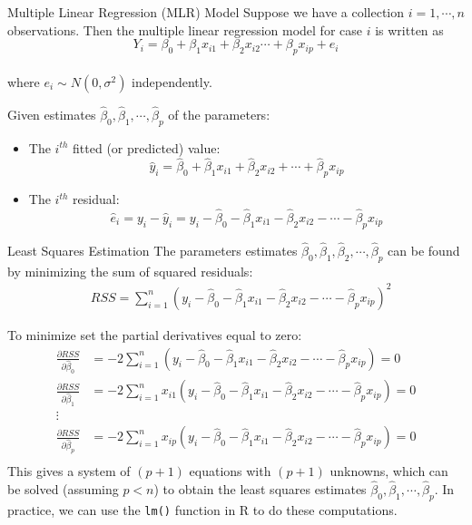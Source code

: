\documentclass[10pt]{beamer}
\begin{document}
\begin{frame}{Multiple Linear Regression (MLR) Model}
Suppose we have a collection $i=1,\cdots,n$ observations.  Then the multiple linear regression model for case $i$ is written as
$$Y_i = \beta_0 + \beta_1 x_{i1} + \beta_2 x_{i2} \cdots + \beta_p x_{ip} + e_i$$\\
where $e_i \sim N(0, \sigma^2)$ independently.
\vspace{15pt}

Given estimates $\hat{\beta}_0, \hat{\beta}_1, \cdots, \hat{\beta}_p$ of the parameters:
\begin{itemize}
\item The $i^{th}$ fitted (or predicted) value:
$$\hat{y}_i = \hat{\beta}_0 + \hat{\beta}_1 x_{i1} + \hat{\beta}_2 x_{i2} + \cdots + \hat{\beta}_p x_{ip}$$
\item The $i^{th}$ residual:
$$\hat{e}_i = y_i-\hat{y}_i = y_i - \hat{\beta}_0 - \hat{\beta}_1 x_{i1} - \hat{\beta}_2 x_{i2} - \cdots - \hat{\beta}_p x_{ip}$$
\end{itemize}
\end{frame}

\begin{frame}{Least Squares Estimation}
The parameters estimates $\hat{\beta}_0, \hat{\beta}_1, \hat{\beta}_2, \cdots, \hat{\beta}_p$ can be found by minimizing the sum of squared residuals:
\begin{align*}
&RSS = \sum_{i=1}^n (y_i - \hat{\beta}_0 - \hat{\beta}_1 x_{i1} - \hat{\beta}_2 x_{i2} - \cdots - \hat{\beta}_p x_{ip})^2
\end{align*}
\end{frame}

\begin{frame}
To minimize set the partial derivatives equal to zero:
\begin{align*}
\frac{\partial RSS}{\partial \hat{\beta}_0} &= -2 \sum_{i=1}^n (y_i - \hat{\beta}_0 - \hat{\beta}_1 x_{i1} - \hat{\beta}_2 x_{i2} - \cdots - \hat{\beta}_p x_{ip}) = 0\\
\frac{\partial RSS}{\partial \hat{\beta}_1} &= -2 \sum_{i=1}^n x_{i1} (y_i - \hat{\beta}_0 - \hat{\beta}_1 x_{i1} - \hat{\beta}_2 x_{i2} - \cdots - \hat{\beta}_p x_{ip}) = 0\\
\vdots\\
\frac{\partial RSS}{\partial \hat{\beta}_p} &= -2 \sum_{i=1}^n x_{ip} (y_i - \hat{\beta}_0 - \hat{\beta}_1 x_{i1} - \hat{\beta}_2 x_{i2} - \cdots - \hat{\beta}_p x_{ip}) = 0\\
\end{align*}
This gives a system of $(p+1)$ equations with $(p+1)$ unknowns, which can be solved (assuming $p<n$) to obtain the least squares estimates $\hat{\beta}_0, \hat{\beta}_1, \cdots, \hat{\beta}_p$.  In practice, we can use the \texttt{lm()} function in R to do these computations.    
\end{frame}
\end{document}
